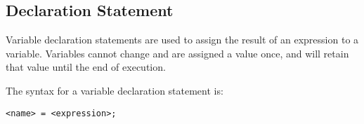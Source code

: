 
\subsection{Declaration Statement}
{
	Variable declaration statements are used to assign the result of an
	expression to a variable. Variables cannot change and are
	assigned a value once, and will retain
	that value until the end of execution.
	
	The syntax for a variable declaration statement is:
	\begin{lstlisting}[numbers=none, texcl = true, language = MAIA]
<name> = <expression>;
	\end{lstlisting}
}
